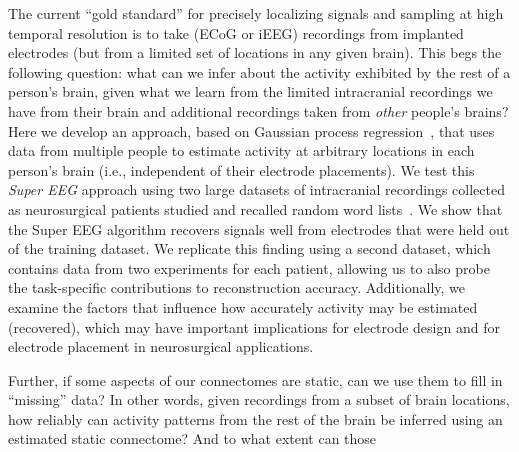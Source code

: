 The current ``gold standard'' for precisely localizing signals and
sampling at high temporal resolution is to take (ECoG or iEEG)
recordings from implanted electrodes (but from a limited set of
locations in any given brain).  This begs the following question: what
can we infer about the activity exhibited by the rest of a person's
brain, given what we learn from the limited intracranial recordings we
have from their brain and additional recordings taken from
\textit{other} people's brains?  Here we develop an approach, based on
Gaussian process regression~\cite{Rasm06}, that uses data from
multiple people to estimate activity at arbitrary
locations in each person's brain (i.e., independent of their electrode
placements).  We test this \textit{Super EEG} approach using two large
datasets of intracranial recordings collected as neurosurgical patients
studied and recalled random word lists~\cite{SedeEtal03, SedeEtal07a,
  SedeEtal07b, MannEtal11, MannEtal12}.  We show that the Super EEG
algorithm recovers signals well from electrodes that were held out of
the training dataset.  We replicate this finding using a second dataset, which contains data from two experiments for each patient, allowing us to also probe the task-specific contributions to reconstruction accuracy.  Additionally, we examine the factors that influence how
accurately activity may be estimated (recovered), which may have important
implications for electrode design and for electrode placement in
neurosurgical applications.

Further, if some aspects of our connectomes are static, can we use them to fill in ``missing'' data?  In other words, given recordings from a subset of brain locations, how reliably can activity patterns from the rest of the brain be inferred using an estimated static connectome?  And to what extent can those


